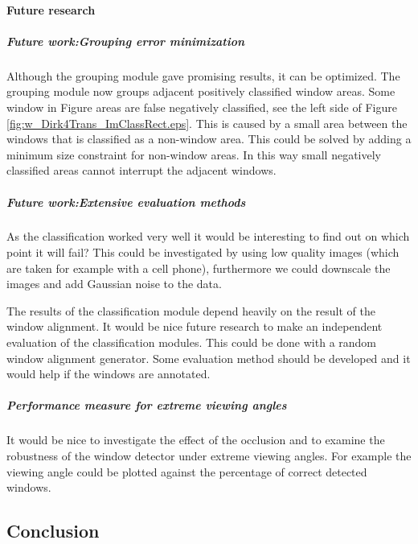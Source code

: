 \paragraph{Future research} %
\subparagraph{Future work:Grouping error minimization}
Although the grouping module gave promising results, it can be optimized.  The
grouping module now groups adjacent positively classified window areas.  Some
window in Figure areas are false negatively classified, see the left side of
Figure \ref{fig:w_Dirk4Trans_ImClassRect.eps}.  This is caused by a small area
between the windows that is classified as a non-window area. This could be
solved by adding a minimum size constraint for non-window areas.
In this way small negatively classified areas cannot interrupt
the adjacent windows.

\label{sec:futureResearchWindowClassification}
\subparagraph{Future work:Extensive evaluation methods}
As the classification worked very well it would be interesting to find out on which
point it will fail?  This could be investigated by using low quality images (which are taken for
example with a cell phone), furthermore we could downscale the images and add
Gaussian noise to the data.\\

The results of the classification module depend heavily on the result of the
window alignment. It would be nice future research to make an independent
evaluation of the classification modules.  This could be done with a random
window alignment generator. Some evaluation method should be developed and it would
help if the windows are annotated.


\subparagraph{Performance measure for extreme viewing angles}
It would be nice to investigate the effect of the occlusion and to examine the
robustness of the window detector under extreme viewing angles.
For example the viewing angle could be plotted against the percentage of
correct detected windows.







\subsection{Conclusion}
